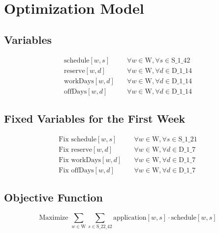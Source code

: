 \documentclass{article}
\begin{document}
\section*{Optimization Model}

\subsection*{Variables}
\begin{align*}
\text{schedule}[w, s] & \quad \forall w \in \text{W}, \forall s \in \text{S\_1\_42} \\
\text{reserve}[w, d] & \quad \forall w \in \text{W}, \forall d \in \text{D\_1\_14} \\
\text{workDays}[w, d] & \quad \forall w \in \text{W}, \forall d \in \text{D\_1\_14} \\
\text{offDays}[w, d] & \quad \forall w \in \text{W}, \forall d \in \text{D\_1\_14}
\end{align*}

\subsection*{Fixed Variables for the First Week}
\begin{align*}
\text{Fix } \text{schedule}[w, s] & \quad \forall w \in \text{W}, \forall s \in \text{S\_1\_21} \\
\text{Fix } \text{reserve}[w, d] & \quad \forall w \in \text{W}, \forall d \in \text{D\_1\_7} \\
\text{Fix } \text{workDays}[w, d] & \quad \forall w \in \text{W}, \forall d \in \text{D\_1\_7} \\
\text{Fix } \text{offDays}[w, d] & \quad \forall w \in \text{W}, \forall d \in \text{D\_1\_7}
\end{align*}

\subsection*{Objective Function}
\[
\text{Maximize } \sum_{w \in \text{W}} \sum_{s \in \text{S\_22\_42}} \text{application}[w, s] \cdot \text{schedule}[w, s]
\]
\end{document}
